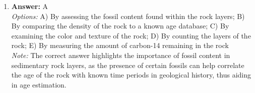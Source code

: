 \documentclass[12pt]{article}
\begin{document}
\begin{enumerate}[label=\arabic*.]
\\ \textit{Options:} A) Earthworms use gills, frogs use both gills and lungs, fish use lungs, and humans use skin.; B) Earthworms and humans use lungs, frogs and fish use gills.; C) All use gills for obtaining oxygen.; D) Earthworms and humans use gills, frogs use skin, and fish use lungs.; E) Earthworms use lungs, frogs use gills, fish use skin, and humans use gills.
\\ \textit{Note:} incorrect because earthworms absorb oxygen through their skin, frogs have both gills for aquatic respiration and lungs for terrestrial breathing, fish primarily use gills for extracting oxygen from water, and humans rely on lungs for respiration.
\item \textbf{Answer:} A
\\ \textit{Options:} A) By assessing the fossil content found within the rock layers; B) By comparing the density of the rock to a known age database; C) By examining the color and texture of the rock; D) By counting the layers of the rock; E) By measuring the amount of carbon-14 remaining in the rock
\\ \textit{Note:} The correct answer highlights the importance of fossil content in sedimentary rock layers, as the presence of certain fossils can help correlate the age of the rock with known time periods in geological history, thus aiding in age estimation.
\end{enumerate}
\end{document}
